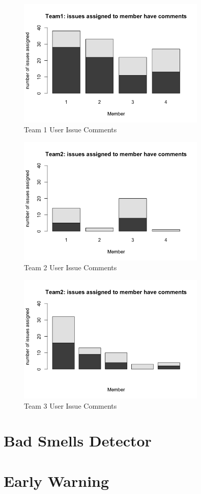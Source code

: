 \documentclass[conference]{IEEEtran}
\begin{document}
\begin{figure}[H]
    \centering
    \includegraphics[width=9cm]{../AprilProject/pic/team1_user_issue_comments.png}
    \caption{Team 1 User Issue Comments}
    \label{team1_issue_comment}
\end{figure}

\begin{figure}[H]
    \centering
    \includegraphics[width=9cm]{../AprilProject/pic/team2_user_issue_comments.png}
    \caption{Team 2 User Issue Comments}
    \label{team2_issue_comment}
\end{figure}

\begin{figure}[H]
    \centering
    \includegraphics[width=9cm]{../AprilProject/pic/team3_user_issue_comments.png}
    \caption{Team 3 User Issue Comments}
    \label{team3_issue_comment}
\end{figure}
\section{Bad Smells Detector}
\section{Early Warning}
\end{document}
